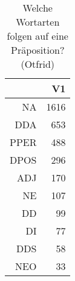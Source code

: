 \begin{table}[ht]
\centering
\begin{tabular}{rr}
  \hline
 & V1 \\ 
  \hline
NA & 1616 \\ 
  DDA & 653 \\ 
  PPER & 488 \\ 
  DPOS & 296 \\ 
  ADJ & 170 \\ 
  NE & 107 \\ 
  DD &  99 \\ 
  DI &  77 \\ 
  DDS &  58 \\ 
  NEO &  33 \\ 
   \hline
\end{tabular}
\caption{Welche Wortarten folgen auf eine Präposition?  (Otfrid)} 
\end{table}
